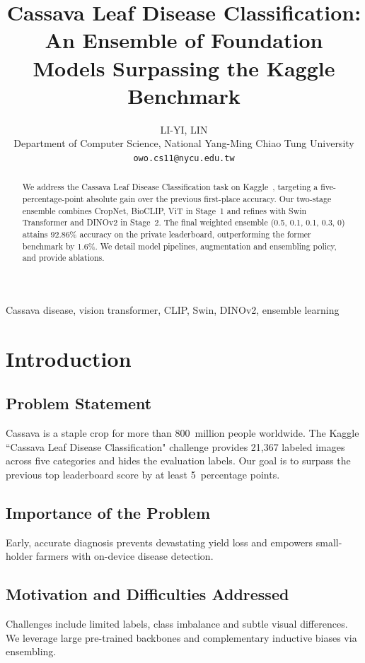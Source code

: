\documentclass[10pt,conference]{IEEEtran}
\title{Cassava Leaf Disease Classification: \newline
       An Ensemble of Foundation Models Surpassing the Kaggle Benchmark}
\author{%
  LI-YI, LIN\\%
  Department of Computer Science, National Yang-Ming Chiao Tung University\\%
  \texttt{owo.cs11@nycu.edu.tw}}
\begin{document}
\maketitle

\begin{abstract}
We address the Cassava Leaf Disease Classification task on Kaggle~\cite{Kaggle}, targeting a five-percentage-point absolute gain over the previous first-place accuracy.  Our two-stage ensemble combines CropNet, BioCLIP, ViT in Stage~1 and refines with Swin Transformer and DINOv2 in Stage~2.  The final weighted ensemble (0.5, 0.1, 0.1, 0.3, 0) attains 92.86\% accuracy on the private leaderboard, outperforming the former benchmark by 1.6\%.  We detail model pipelines, augmentation and ensembling policy, and provide ablations.
\end{abstract}
\begin{IEEEkeywords}
Cassava disease, vision transformer, CLIP, Swin, DINOv2, ensemble learning
\end{IEEEkeywords}

\section{Introduction}
\subsection{Problem Statement}
Cassava is a staple crop for more than 800~million people worldwide.  The Kaggle ``Cassava Leaf Disease Classification" challenge provides 21,367 labeled images across five categories and hides the evaluation labels.  Our goal is to surpass the previous top leaderboard score by at least 5~percentage points.

\subsection{Importance of the Problem}
Early, accurate diagnosis prevents devastating yield loss and empowers small-holder farmers with on-device disease detection.

\subsection{Motivation and Difficulties Addressed}
Challenges include limited labels, class imbalance and subtle visual differences.  We leverage large pre-trained backbones and complementary inductive biases via ensembling.
\end{document}
